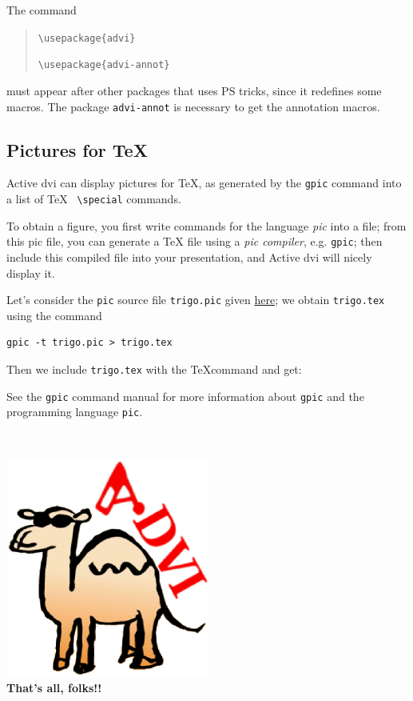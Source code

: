 \documentclass[12pt]{article}
\begin{document}
The command 
\begin{quote}

\verb"\usepackage{advi}"

\verb"\usepackage{advi-annot}"

\end{quote}
must appear after other packages that uses PS tricks, since it redefines
some macros.  The package \verb"advi-annot" is necessary to get
the annotation macros.

\newpage

\subsection*{Pictures for \TeX}

Active dvi can display pictures for \TeX, as generated by
the \verb"gpic" command into a list of \TeX~ \verb"\special" commands.

\bigskip

To obtain a figure, you first write commands for the language
{\em pic} into a file; from this pic file, you can generate a \TeX
file using a {\em pic compiler}, e.g. \verb"gpic"; then include this
compiled file into your presentation, and Active dvi will nicely display it.

Let's consider the \verb"pic" source file \verb"trigo.pic" given
\hyperref{trigo_source.dvi}{}{}{here}; we obtain
\verb"trigo.tex" using the command 
\begin{verbatim}
gpic -t trigo.pic > trigo.tex
\end{verbatim}

Then we include \verb"trigo.tex" with the \TeX command
\verb|| and get:

\def\showgraph{%
  \par\medskip\centerline{\raise 1em\box\graph}\bigskip\noindent\ignorespaces}



See the \verb"gpic" command manual for more information about
\verb"gpic" and the programming language \verb"pic".

\lastpage

~\vfill
\begin{center}
\includegraphics[width=0.5\textwidth]{../tex/advilogo.eps}\\
{\Large \bf That's all, folks!!}
\end{center}
\vfill
\end{document}
